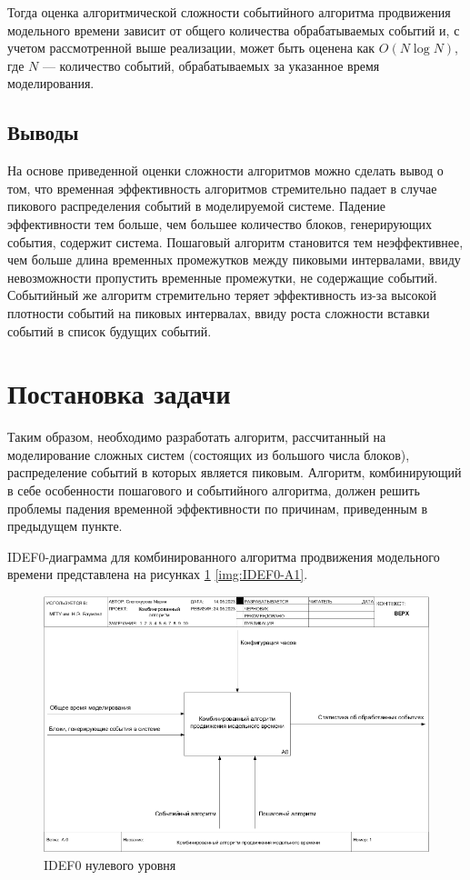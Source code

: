 Тогда оценка алгоритмической сложности событийного алгоритма продвижения модельного времени зависит от общего количества обрабатываемых событий и, с учетом рассмотренной выше реализации, может быть оценена как $O(N\log{N})$, где $N$ --- количество событий, обрабатываемых за указанное время моделирования.

\subsection{Выводы}
На основе приведенной оценки сложности алгоритмов можно сделать вывод о том, что временная эффективность алгоритмов стремительно падает в случае пикового распределения событий в моделируемой системе. Падение эффективности тем больше, чем большее количество блоков, генерирующих события, содержит система.
Пошаговый алгоритм становится тем неэффективнее, чем больше длина временных промежутков между пиковыми интервалами, ввиду невозможности пропустить временные промежутки, не содержащие событий. Событийный же алгоритм стремительно теряет эффективность из-за высокой плотности событий на пиковых интервалах, ввиду роста сложности вставки событий в список будущих событий.

\section{Постановка задачи}
Таким образом, необходимо разработать алгоритм, рассчитанный на моделирование сложных систем (состоящих из большого числа блоков), распределение событий в которых является пиковым. Алгоритм, комбинирующий в себе особенности пошагового и событийного алгоритма, должен решить проблемы падения временной эффективности по причинам, приведенным в предыдущем пункте.

IDEF0-диаграмма для комбинированного алгоритма продвижения модельного времени представлена на рисунках \ref{img:IDEF0-A0} \ref{img:IDEF0-A1}.

\begin{figure}[h!btp]
	\centering
	\includegraphics[width=1\columnwidth]{inc/img/IDEF0-A0.png}
	\caption{IDEF0 нулевого уровня}
	\label{img:IDEF0-A0}	
\end{figure}

